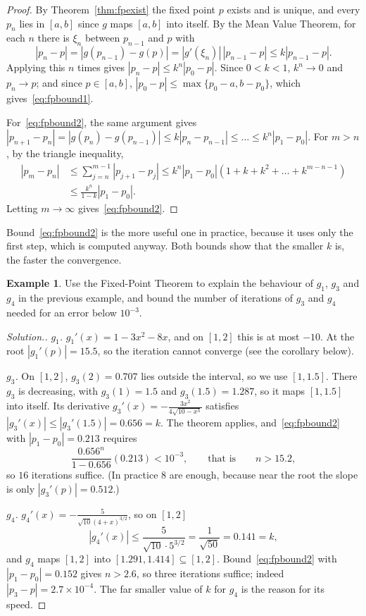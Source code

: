 \documentclass[11pt,a4paper]{article}
\numberwithin{equation}{section}
\theoremstyle{definition}
\newtheorem{exa}[thm]{Example}
\newenvironment{solution}
  {\renewcommand{\qedsymbol}{}\begin{proof}[\textit{Solution}.]}
  {\end{proof}}
\begin{document}
\begin{proof}
By Theorem~\ref{thm:fpexist} the fixed point $p$ exists and is unique, and every $p_n$ lies in $[a,b]$ since $g$ maps $[a,b]$ into
itself. By the Mean Value Theorem, for each $n$ there is $\xi_n$ between $p_{n-1}$ and $p$ with
$$|p_n-p| = |g(p_{n-1})-g(p)| = |g'(\xi_n)|\,|p_{n-1}-p|\leq k|p_{n-1}-p| .$$
Applying this $n$ times gives $|p_n-p|\leq k^n|p_0-p|$. Since $0<k<1$, $k^n\longrightarrow0$ and $p_n\longrightarrow p$; and since $p\in[a,b]$,
$|p_0-p|\leq\max\{p_0-a,b-p_0\}$, which gives~\eqref{eq:fpbound1}.

For~\eqref{eq:fpbound2}, the same argument gives $|p_{n+1}-p_n| = |g(p_n)-g(p_{n-1})|\leq k|p_n-p_{n-1}|\leq\dots\leq k^n|p_1-p_0|$. For
$m>n$, by the triangle inequality,
\begin{align*}
|p_m-p_n|&\leq\sum_{j=n}^{m-1}|p_{j+1}-p_j|\leq k^n|p_1-p_0|\left(1+k+k^2+\dots+k^{m-n-1}\right)\\
&\leq\frac{k^n}{1-k}|p_1-p_0| .
\end{align*}
Letting $m\longrightarrow\infty$ gives~\eqref{eq:fpbound2}.
\end{proof}

Bound~\eqref{eq:fpbound2} is the more useful one in practice, because it uses only the first step, which is computed anyway. Both bounds
show that the smaller $k$ is, the faster the convergence.

\begin{exa}
\label{exa:g3g4}
Use the Fixed-Point Theorem to explain the behaviour of $g_1$, $g_3$ and $g_4$ in the previous example, and bound the number of
iterations of $g_3$ and $g_4$ needed for an error below $10^{-3}$.
\end{exa}

\begin{solution}
\emph{$g_1$.} $g_1'(x) = 1-3x^2-8x$, and on $[1,2]$ this is at most $-10$. At the root $|g_1'(p)| = 15.5$, so the iteration cannot converge
(see the corollary below).

\emph{$g_3$.} On $[1,2]$, $g_3(2) = 0.707$ lies outside the interval, so we use $[1,1.5]$. There $g_3$ is decreasing, with $g_3(1) = 1.5$
and $g_3(1.5) = 1.287$, so it maps $[1,1.5]$ into itself. Its derivative $g_3'(x) = -\frac{3x^2}{4\sqrt{10-x^3}}$ satisfies
$|g_3'(x)|\leq|g_3'(1.5)| = 0.656 = k$. The theorem applies, and~\eqref{eq:fpbound2} with $|p_1-p_0| = 0.213$ requires
$$\frac{0.656^n}{1-0.656}(0.213)<10^{-3},\qquad\text{that is}\qquad n>15.2,$$
so $16$ iterations suffice. (In practice $8$ are enough, because near the root the slope is only $|g_3'(p)| = 0.512$.)

\emph{$g_4$.} $g_4'(x) = -\frac{5}{\sqrt{10}(4+x)^{3/2}}$, so on $[1,2]$
$$|g_4'(x)|\leq\frac{5}{\sqrt{10}\cdot5^{3/2}} = \frac{1}{\sqrt{50}} = 0.141 = k,$$
and $g_4$ maps $[1,2]$ into $[1.291,1.414]\subseteq[1,2]$. Bound~\eqref{eq:fpbound2} with $|p_1-p_0| = 0.152$ gives $n>2.6$, so three
iterations suffice; indeed $|p_3-p| = 2.7\times10^{-4}$. The far smaller value of $k$ for $g_4$ is the reason for its speed.
\end{solution}
\end{document}

